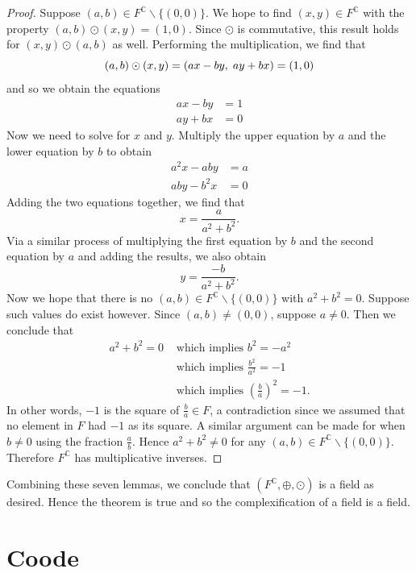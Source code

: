 \documentclass[12pt]{article}
\newcommand{\C}{\mathbb{C}}
\newcommand{\ttc}{, \hspace{1mm}}
\theoremstyle{plain}
\theoremstyle{definition}
\begin{document}
\begin{appendices}
\begin{proof}
Suppose $(a,b)\in F^\C\backslash\{(0,0)\}$. We hope to find $(x,y)\in F^\C$ with the property $(a,b)\odot(x,y) = (1,0)$. Since $\odot$ is commutative, this result holds for $(x,y)\odot(a,b)$ as well. Performing the multiplication, we find that
	\[
		(a,b)\odot(x,y) = (ax - by\ttc ay + bx) = (1,0)
	\]
	and so we obtain the equations
	\begin{align*}
		ax - by & = 1\\
		ay + bx & = 0
	\end{align*}
	Now we need to solve for $x$ and $y$. Multiply the upper equation by $a$ and the lower equation by $b$ to obtain
	\begin{align*}
		a^2x - aby & = a\\
		aby - b^2x & = 0
	\end{align*}
	Adding the two equations together, we find that
	\[
		x = \frac{a}{a^2 + b^2}.
	\]
	Via a similar process of multiplying the first equation by $b$ and the second equation by $a$ and adding the results, we also obtain
	\[
		y = \frac{-b}{a^2 + b^2}.
	\]
	Now we hope that there is no $(a,b)\in F^\C\backslash\{(0,0)\}$ with $a^2 + b^2 = 0$. Suppose such values do exist however. Since $(a,b)\neq (0,0)$, suppose $a\neq 0$. Then we conclude that
	\begin{align*}
		a^2 + b^2 = 0 & \text{ which implies } b^2 = -a^2\\
		& \text{ which implies } \frac{b^2}{a^2} = -1\\
		& \text{ which implies } \left(\frac{b}{a}\right)^2 = -1.
	\end{align*}
 	In other words, $-1$ is the square of $\frac{b}{a}\in F$, a contradiction since we assumed that no element in $F$ had $-1$ as its square. A similar argument can be made for when $b \neq 0$ using the fraction $\frac{a}{b}$. Hence $a^2 + b^2 \neq 0$ for any $(a,b)\in F^\C\backslash\{(0,0)\}$. Therefore $F^\C$ has multiplicative inverses.
\end{proof} 	
 	
Combining these seven lemmas, we conclude that $(F^\C,\oplus,\odot)$ is a field as desired. Hence the theorem is true and so the complexification of a field is a field. 





\newpage
\section{Coode} \label{appendixC}


\end{appendices}
\end{document}
